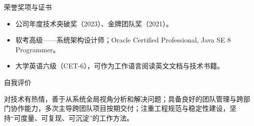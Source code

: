 \documentclass[10.5pt,fontset=windows]{ctexart}
\newcommand{\rsection}[1]{%
  \Needspace*{6\baselineskip}%
  \vspace{9pt}%
  {\color{maincolor}\heiti\zihao{4}#1}\par
  \vspace{1pt}{\color{maincolor}\rule{\textwidth}{1pt}}\par
  \vspace{3pt}}
\begin{document}
\rsection{荣誉奖项与证书}
\begin{itemize}
  \item 公司年度技术突破奖（2023）、金牌团队奖（2021）。
  \item 软考高级——系统架构设计师；Oracle Certified Professional, Java SE 8 Programmer。
  \item 大学英语六级（CET-6），可作为工作语言阅读英文文档与技术书籍。
\end{itemize}

\rsection{自我评价}
对技术有热情，善于从系统全局视角分析和解决问题；具备良好的团队管理与跨部门协作能力，多次主导跨团队项目按期交付；注重工程规范与稳定性建设，坚持“可度量、可复现、可沉淀”的工作方法。
\end{document}

